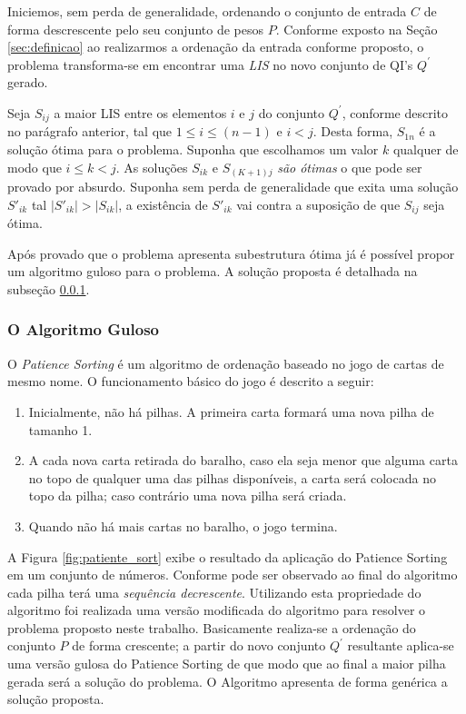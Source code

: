 \documentclass[12pt]{article}
\begin{document}
Iniciemos, sem perda de generalidade, ordenando o conjunto de entrada $C$ de forma descrescente pelo seu conjunto de pesos $P$. Conforme exposto na Seção \ref{sec:definicao} ao realizarmos a ordenação da entrada conforme proposto, o problema transforma-se em encontrar uma \textit{LIS} no novo conjunto de QI's $Q^{'}$ gerado.

Seja $S_{ij}$ a maior LIS entre os elementos $i$ e $j$ do conjunto  $Q^{'}$, conforme descrito no parágrafo anterior, tal que $1 \leq i \leq (n-1)$ e $i < j$. Desta forma, $S_{1n}$ é a solução ótima para o problema. Suponha que escolhamos um valor $k$ qualquer de modo que $ i \leq k < j$. As soluções $S_{ik}$ e $S_{(K+1)j}$ \textit{são ótimas} o que pode ser provado por absurdo. Suponha sem perda de generalidade que exita uma solução $S'_{ik}$ tal $|S'_{ik}| > |S_{ik}|$, a existência de $S'_{ik}$ vai contra a suposição de que $S_{ij}$ seja ótima.

Após provado que o problema apresenta subestrutura ótima já é possível propor um algoritmo guloso para o problema. A solução proposta é detalhada na subseção \ref{subsubsec:alg_guloso}.

\subsubsection{O Algoritmo Guloso}
\label{subsubsec:alg_guloso}

O \textit{Patience Sorting} é um algoritmo de ordenação baseado no jogo de cartas de mesmo nome. O funcionamento básico do jogo é descrito a seguir:

\begin{enumerate}
  \item Inicialmente, não há pilhas. A primeira carta formará uma nova pilha de tamanho 1.
  \item A cada nova carta retirada do baralho, caso ela seja menor que alguma carta no topo de qualquer uma das pilhas disponíveis, a carta será colocada no topo da pilha; caso contrário uma nova pilha será criada.
  \item Quando não há mais cartas no baralho, o jogo termina.
\end{enumerate}

A Figura \ref{fig:patiente_sort} exibe o resultado da aplicação do Patience Sorting em um conjunto de números. Conforme pode ser observado ao final do algoritmo cada pilha terá uma \textit{sequência decrescente}. Utilizando esta propriedade do algoritmo foi realizada uma versão modificada do algoritmo para resolver o problema proposto neste trabalho. Basicamente realiza-se a ordenação do conjunto $P$ de forma crescente; a partir do novo conjunto $Q^{'}$ resultante aplica-se uma versão gulosa do Patience Sorting de que modo que ao final a maior pilha gerada será a solução do problema. O Algoritmo apresenta de forma genérica a solução proposta.
\end{document}
